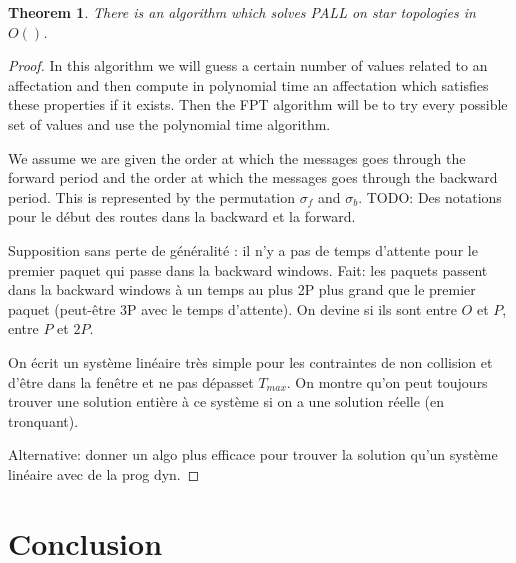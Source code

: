 \documentclass[a4paper,10pt]{article}
\newtheorem{theorem}{Theorem}
\newcommand{\todo}[1]{{\color{red} TODO: {#1}}}
\begin{document}
      
      \begin{theorem}
       There is an algorithm which solves PALL on star topologies in $O( )$.
      \end{theorem}
      \begin{proof}
       In this algorithm we will guess a certain number of values related to an affectation and then compute in polynomial time
       an affectation which satisfies these properties if it exists. Then the FPT algorithm will be to try every possible set of values 
       and use the polynomial time algorithm.
       
       We assume we are given the order at which the messages goes through the forward
       period and the order at which the messages goes through the backward period. 
       This is represented by the permutation $\sigma_f$ and $\sigma_b$. \todo{Des notations pour 
       le début des routes dans la backward et la forward}.
       
       Supposition sans perte de généralité : il n'y a pas de temps d'attente  pour le premier paquet qui passe dans 
       la backward windows.
       Fait: les paquets passent dans la backward windows à un temps au plus 2P plus grand que le premier paquet (peut-être 3P avec
       le temps d'attente). 
       On devine si ils sont entre $O$ et $P$, entre $P$ et $2P$.
       
       On écrit un système linéaire très simple pour les contraintes de non collision et d'être dans la fenêtre
       et ne pas dépasset $T_{max}$.
       On montre qu'on peut toujours trouver une solution entière à ce système si on a une solution réelle (en tronquant).
       
       Alternative: donner un algo plus efficace pour trouver la solution qu'un système linéaire avec de la prog dyn.
       
      \end{proof}
 
\section{Conclusion}





\end{document}
